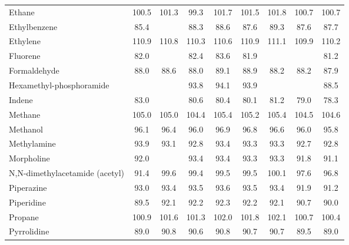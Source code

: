 {\begin{longtable}{m{3.1cm} | c c c c c c c c}
Ethane                           & 100.5     &  101.3   &   99.3   &   101.7     &   101.5    &  101.8   & 100.7   &   100.7   \\
Ethylbenzene                     &  85.4     &          &   88.3   &    88.6     &    87.6    &   89.3   &  87.6   &    87.7   \\
Ethylene                         & 110.9     &  110.8   &  110.3   &   110.6     &   110.9    &  111.1   & 109.9   &   110.2   \\
Fluorene                         &  82.0     &          &   82.4   &    83.6     &    81.9    &          &         &    81.2   \\
Formaldehyde                     &  88.0     &   88.6   &   88.0   &    89.1     &    88.9    &   88.2   &  88.2   &    87.9   \\
Hexamethyl-phosphoramide         &           &          &   93.8   &    94.1     &    93.9    &          &         &    88.5   \\
Indene                           &  83.0     &          &   80.6   &    80.4     &    80.1    &   81.2   &  79.0   &    78.3   \\
Methane                          & 105.0     &  105.0   &  104.4   &   105.4     &   105.2    &  105.4   & 104.5   &   104.6   \\
Methanol                         &  96.1     &   96.4   &   96.0   &    96.9     &    96.8    &   96.6   &  96.0   &    95.8   \\
Methylamine                      &  93.9     &   93.1   &   92.8   &    93.4     &    93.3    &   93.3   &  92.7   &    92.8   \\
Morpholine                       &  92.0     &          &   93.4   &    93.4     &    93.3    &   93.3   &  91.8   &    91.1   \\
N,N-dimethylacetamide (acetyl)   &  91.4     &   99.6   &   99.4   &    99.5     &    99.5    &  100.1   &  97.6   &    96.8   \\
Piperazine                       &  93.0     &   93.4   &   93.5   &    93.6     &    93.5    &   93.4   &  91.9   &    91.2   \\
Piperidine                       &  89.5     &   92.1   &   92.2   &    92.3     &    92.2    &   92.1   &  90.7   &    90.0   \\
Propane                          & 100.9     &  101.6   &  101.3   &   102.0     &   101.8    &  102.1   & 100.7   &   100.4   \\
Pyrrolidine                      &  89.0     &   90.8   &   90.6   &    90.8     &    90.7    &   90.7   &  89.5   &    89.0   \\

\end{longtable}}
